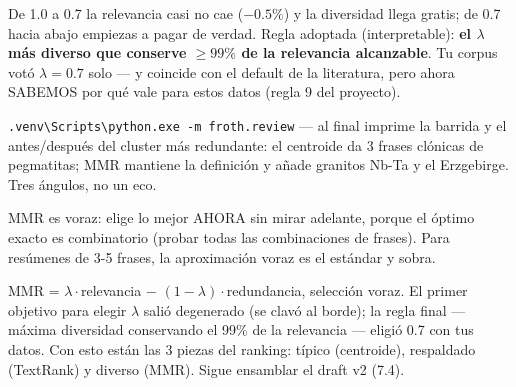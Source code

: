 \documentclass[11pt,a4paper]{article}
\begin{document}
De 1.0 a 0.7 la relevancia casi no cae ($-0.5\%$) y la diversidad llega gratis; de 0.7
hacia abajo empiezas a pagar de verdad. Regla adoptada (interpretable): \textbf{el
$\lambda$ más diverso que conserve $\geq 99\%$ de la relevancia alcanzable}. Tu corpus
votó $\lambda = 0.7$ solo --- y coincide con el default de la literatura, pero ahora
SABEMOS por qué vale para estos datos (regla 9 del proyecto).

\begin{practica}
\texttt{.venv\textbackslash Scripts\textbackslash python.exe -m froth.review} ---
al final imprime la barrida y el antes/después del cluster más redundante: el centroide
da 3 frases clónicas de pegmatitas; MMR mantiene la definición y añade granitos Nb-Ta y
el Erzgebirge. Tres ángulos, no un eco.
\end{practica}

\begin{ojo}
MMR es voraz: elige lo mejor AHORA sin mirar adelante, porque el óptimo exacto es
combinatorio (probar todas las combinaciones de frases). Para resúmenes de 3-5 frases,
la aproximación voraz es el estándar y sobra.
\end{ojo}

\begin{resumen}
MMR = $\lambda \cdot$relevancia $-$ $(1-\lambda) \cdot$redundancia, selección voraz.
El primer objetivo para elegir $\lambda$ salió degenerado (se clavó al borde); la regla
final --- máxima diversidad conservando el 99\% de la relevancia --- eligió 0.7 con tus
datos. Con esto están las 3 piezas del ranking: típico (centroide), respaldado
(TextRank) y diverso (MMR). Sigue ensamblar el draft v2 (7.4).
\end{resumen}
\end{document}
